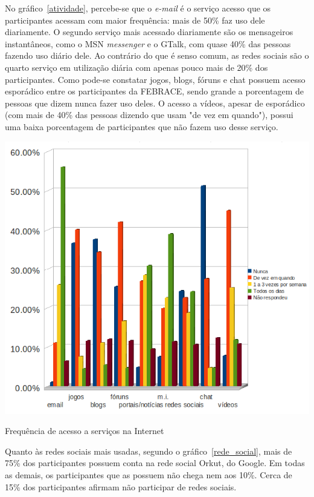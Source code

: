   No gráfico~\ref{atividade}, percebe-se que o \textit{e-mail} é o serviço acesso que os participantes acessam com maior frequência: mais de 50\% 
faz uso dele diariamente. O segundo serviço mais acessado diariamente são os mensageiros instantâneos, como o MSN \textit{messenger} e o GTalk, 
com quase 40\%  das pessoas fazendo uso diário dele. Ao contrário do que é senso comum, as redes sociais são o quarto serviço em utilização diária 
com apenas pouco mais de 20\% dos participantes. Como pode-se constatar jogos, blogs, fóruns e chat possuem acesso esporádico entre os participantes 
da FEBRACE, sendo grande a porcentagem de pessoas que dizem nunca fazer uso deles. O acesso a vídeos, apesar de esporádico (com mais de 40\% das 
pessoas dizendo que usam "de vez em quando"), possui uma baixa porcentagem de participantes que não fazem uso desse serviço.

  \begin{grafico}
      \begin{center}
	\includegraphics[width=0.7\linewidth]{arquivos/atividade.png}
      \end{center}
      \caption{Frequência de acesso a serviços na Internet}
      \label{atividade}
  \end{grafico}

  Quanto às redes sociais mais usadas, segundo o gráfico~\ref{rede_social}, mais de 75\% dos participantes possuem conta na rede social Orkut, do 
Google. Em todas as demais, os participantes que as possuem não chega nem aos 10\%. Cerca de 15\% dos participantes afirmam não participar de redes 
sociais.


